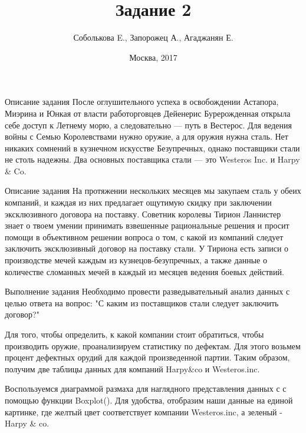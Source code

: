 \documentclass{beamer}
\title{Задание 2}
\author{Соболькова E., Запорожец А., Агаджанян Е.}
\institute{МГУ имени М. В. Ломоносова}
\date{Москва, 2017}
\begin{document}
	\maketitle
	
\begin{frame}{Описание задания} 
	После оглушительного успеха в освобождении Астапора, Миэрина и Юнкая от власти работорговцев Дейенерис Бурерожденная открыла себе доступ к Летнему морю, а следовательно — путь в Вестерос. 
	Для ведения войны с Семью Королевствами нужно оружие, а для оружия нужна сталь. Нет никаких сомнений в кузнечном искусстве Безупречных, однако поставщики стали не столь надежны. 
	Два основных поставщика стали — это Westeros Inc. и Harpy \& Co. 
\end{frame} 

\begin{frame}{Описание задания} 
На протяжении нескольких месяцев мы закупаем сталь у обеих компаний, и каждая из них предлагает ощутимую скидку при заключении эксклюзивного договора на поставку.
Советник королевы Тирион Ланнистер знает о твоем умении принимать взвешенные рациональные решения и просит помощи в объективном решении вопроса о том, с какой из компаний следует заключить эксклюзивный договор на поставку стали. 
У Тириона есть записи о производстве мечей каждым из кузнецов-безупречных, а также данные о количестве сломанных мечей в каждый из месяцев ведения боевых действий. 
\end{frame} 

\begin{frame}{Выполнение задания} 
Необходимо провести разведывательный анализ данных с целью ответа на вопрос: "С каким из поставщиков стали следует заключить договор?"
\end{frame}
\begin{frame}
Для того, чтобы определить, к какой компании стоит обратиться, чтобы производить оружие, проанализируем статистику по дефектам. Для этого  возьмем процент дефектных орудий для каждой произведенной партии. Таким образом, получим две таблицы данных для компаний Harpy&co и Westeros.inc. 
\end{frame}

\begin{frame}
Воспользуемся диаграммой размаха для наглядного представления данных с с помощью функции Boxplot().
Для удобства, отобразим наши данные на единой картинке, где желтый цвет соответствует компании Westeros.inc, а зеленый - Harpy & co.
\end{frame}
\end{document}
